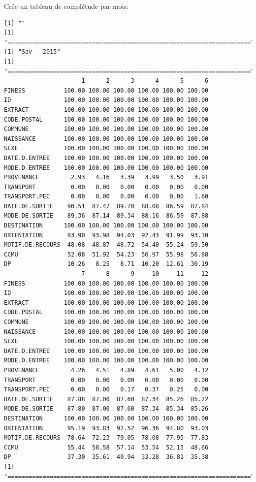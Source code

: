 \documentclass[]{article}
\begin{document}
Crée un tableau de complétude par mois:

\begin{verbatim}
[1] ""
[1] "====================================================================="
[1] "Sav - 2015"
[1] "====================================================================="
                      1      2      3      4      5      6
FINESS           100.00 100.00 100.00 100.00 100.00 100.00
ID               100.00 100.00 100.00 100.00 100.00 100.00
EXTRACT          100.00 100.00 100.00 100.00 100.00 100.00
CODE.POSTAL      100.00 100.00 100.00 100.00 100.00 100.00
COMMUNE          100.00 100.00 100.00 100.00 100.00 100.00
NAISSANCE        100.00 100.00 100.00 100.00 100.00 100.00
SEXE             100.00 100.00 100.00 100.00 100.00 100.00
DATE.D.ENTREE    100.00 100.00 100.00 100.00 100.00 100.00
MODE.D.ENTREE    100.00 100.00 100.00 100.00 100.00 100.00
PROVENANCE         2.93   4.16   3.39   3.99   3.50   3.91
TRANSPORT          0.00   0.00   0.00   0.00   0.00   0.00
TRANSPORT.PEC      0.00   0.00   0.00   0.00   0.00   1.60
DATE.DE.SORTIE    90.51  87.47  89.70  88.08  86.59  87.84
MODE.DE.SORTIE    89.36  87.14  89.34  88.16  86.59  87.88
DESTINATION      100.00 100.00 100.00 100.00 100.00 100.00
ORIENTATION       93.90  93.98  94.03  92.43  91.99  93.10
MOTIF.DE.RECOURS  48.08  48.87  48.72  54.40  55.24  59.50
CCMU              52.08  51.92  54.23  56.97  55.98  56.88
DP                10.26   8.25   8.71  10.20  12.61  30.19
                      7      8      9     10     11     12
FINESS           100.00 100.00 100.00 100.00 100.00 100.00
ID               100.00 100.00 100.00 100.00 100.00 100.00
EXTRACT          100.00 100.00 100.00 100.00 100.00 100.00
CODE.POSTAL      100.00 100.00 100.00 100.00 100.00 100.00
COMMUNE          100.00 100.00 100.00 100.00 100.00 100.00
NAISSANCE        100.00 100.00 100.00 100.00 100.00 100.00
SEXE             100.00 100.00 100.00 100.00 100.00 100.00
DATE.D.ENTREE    100.00 100.00 100.00 100.00 100.00 100.00
MODE.D.ENTREE    100.00 100.00 100.00 100.00 100.00 100.00
PROVENANCE         4.26   4.51   4.89   4.61   5.00   4.12
TRANSPORT          0.00   0.00   0.00   0.00   0.00   0.00
TRANSPORT.PEC      0.00   0.00   0.17   0.37   0.25   0.00
DATE.DE.SORTIE    87.88  87.00  87.60  87.34  85.26  85.22
MODE.DE.SORTIE    87.80  87.00  87.60  87.34  85.34  85.26
DESTINATION      100.00 100.00 100.00 100.00 100.00 100.00
ORIENTATION       95.19  93.83  92.52  96.36  94.80  93.03
MOTIF.DE.RECOURS  78.64  72.23  79.05  78.08  77.95  77.83
CCMU              55.44  58.58  57.14  53.54  52.15  48.66
DP                37.30  35.61  40.94  33.28  36.81  35.38
[1] "====================================================================="
\end{verbatim}
\end{document}
